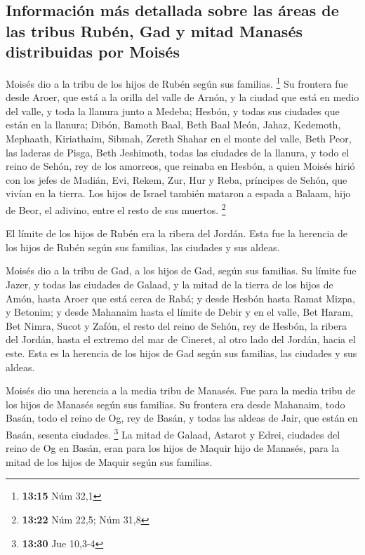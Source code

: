 \hypertarget{informaciuxf3n-muxe1s-detallada-sobre-las-uxe1reas-de-las-tribus-rubuxe9n-gad-y-mitad-manasuxe9s-distribuidas-por-moisuxe9s}{%
\subsection{Información más detallada sobre las áreas de las tribus
Rubén, Gad y mitad Manasés distribuidas por
Moisés}\label{informaciuxf3n-muxe1s-detallada-sobre-las-uxe1reas-de-las-tribus-rubuxe9n-gad-y-mitad-manasuxe9s-distribuidas-por-moisuxe9s}}

 Moisés dio a la tribu de los hijos de Rubén según sus
familias. \footnote{\textbf{13:15} Núm 32,1}  Su frontera
fue desde Aroer, que está a la orilla del valle de Arnón, y la ciudad
que está en medio del valle, y toda la llanura junto a Medeba;
 Hesbón, y todas sus ciudades que están en la llanura;
Dibón, Bamoth Baal, Beth Baal Meón,  Jahaz, Kedemoth,
Mephaath,  Kiriathaim, Sibmah, Zereth Shahar en el monte
del valle,  Beth Peor, las laderas de Pisga, Beth
Jeshimoth,  todas las ciudades de la llanura, y todo el
reino de Sehón, rey de los amorreos, que reinaba en Hesbón, a quien
Moisés hirió con los jefes de Madián, Evi, Rekem, Zur, Hur y Reba,
príncipes de Sehón, que vivían en la tierra.  Los hijos
de Israel también mataron a espada a Balaam, hijo de Beor, el adivino,
entre el resto de sus muertos. \footnote{\textbf{13:22} Núm 22,5; Núm
  31,8}

 El límite de los hijos de Rubén era la ribera del
Jordán. Esta fue la herencia de los hijos de Rubén según sus familias,
las ciudades y sus aldeas.

 Moisés dio a la tribu de Gad, a los hijos de Gad, según
sus familias.  Su límite fue Jazer, y todas las ciudades
de Galaad, y la mitad de la tierra de los hijos de Amón, hasta Aroer que
está cerca de Rabá;  y desde Hesbón hasta Ramat Mizpa, y
Betonim; y desde Mahanaim hasta el límite de Debir  y en
el valle, Bet Haram, Bet Nimra, Sucot y Zafón, el resto del reino de
Sehón, rey de Hesbón, la ribera del Jordán, hasta el extremo del mar de
Cineret, al otro lado del Jordán, hacia el este.  Esta es
la herencia de los hijos de Gad según sus familias, las ciudades y sus
aldeas.

 Moisés dio una herencia a la media tribu de Manasés. Fue
para la media tribu de los hijos de Manasés según sus familias.
 Su frontera era desde Mahanaim, todo Basán, todo el
reino de Og, rey de Basán, y todas las aldeas de Jair, que están en
Basán, sesenta ciudades. \footnote{\textbf{13:30} Jue 10,3-4}
 La mitad de Galaad, Astarot y Edrei, ciudades del reino
de Og en Basán, eran para los hijos de Maquir hijo de Manasés, para la
mitad de los hijos de Maquir según sus familias.

